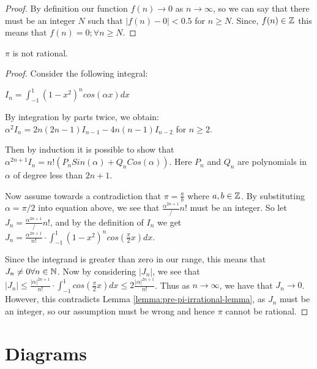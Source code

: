 \begin{proof}
    By definition our function $f(n) \rightarrow 0$ as $n \rightarrow \infty$, so we can say that there must be an integer $N$ such that $|f(n)-0|<0.5$ for $n\geq N$. Since, $f(n) \in \mathbb Z$ this means that $f(n)=0; \forall n \geq N$.
\end{proof}

\begin{theorem}
    $\pi$ is not rational.
\end{theorem}

\begin{proof}

    Consider the following integral:

    $I_n = \int_{-1}^{1} (1-x^2)^ncos(\alpha x)dx$

    By integration by parts twice, we obtain:
    $\alpha^2I_n=2n(2n-1)I_{n-1}-4n(n-1)I_{n-2}$ for $n\geq 2$.

    Then by induction it is possible to show that $\alpha^{2n+1}I_n=n!(P_nSin(\alpha)+Q_nCos(\alpha))$.
    Here $P_n$ and $Q_n$ are polynomials in $\alpha$ of degree less than $2n+1$.

    Now assume towards a contradiction that $\pi = \frac{a}{b}$ where $a,b\in \mathbb Z$. By substituting $\alpha = \pi/2$ into equation above, we see that $\frac{\alpha^{2n+1}}/{n!}$ must be an integer. So let $J_n = \frac{\alpha^{2n+1}}/{n!}$, and by the definition of $I_n$ we get $J_n = \frac{\alpha^{2n+1}}{n!}\cdot \int_{-1}^{1} (1-x^2)^ncos(\frac{\pi}{2} x)dx$.

    Since the integrand is greater than zero in our range, this means that $J_n \neq 0 \forall n \in \mathbb N$. Now by considering $|J_n|$, we see that $|J_n| \leq \frac{|\alpha|^{2n+1}}{n!} \cdot \int_{-1}^1cos(\frac{\pi}{2}x)dx \leq 2\frac{|\alpha|^{2n+1}}{n!}$. Thus as $n\rightarrow \infty$, we have that $J_n\rightarrow 0$. However, this contradicts Lemma \ref{lemma:pre-pi-irrational-lemma}, as $J_n$ must be an integer, so our assumption must be wrong and hence $\pi$ cannot be rational.
\end{proof}

\newpage
\section{Diagrams}

